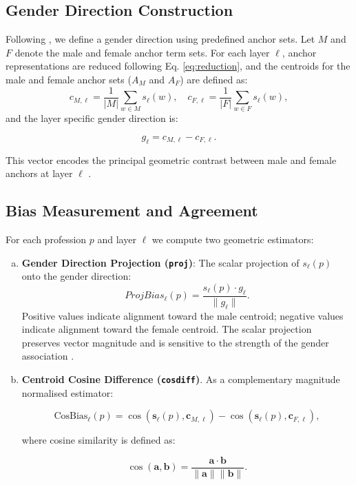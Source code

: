 \documentclass[english, a4paper, 11.5pt, twoside]{article}
\begin{document}
\subsection{Gender Direction Construction}
Following \cite{Bolukbasi:2016}, we define a gender direction using predefined anchor sets. Let $M$ and $F$ denote the male and female anchor term sets. For each layer $\ell$, anchor representations are reduced following Eq. \eqref{eq:reduction}, and the centroids for the male and female anchor sets ($A_M$ and $A_F$) are defined as: 
\begin{equation}
c_{M,\ell} = \frac{1}{|M|}\sum_{w \in M} s_\ell(w), \quad c_{F,\ell} = \frac{1}{|F|}\sum_{w \in F} s_\ell(w),
\end{equation}
and the layer specific gender direction is:

\begin{equation}
g_\ell = c_{M,\ell} - c_{F,\ell}.
\end{equation}

This vector encodes the principal geometric contrast between male and female anchors at layer $\ell$ \parencite{Bolukbasi:2016}.

\subsection{Bias Measurement and Agreement}
For each profession $p$ and layer $\ell$ we compute two geometric estimators:
\begin{enumerate}[(a)]
    \item \textbf{Gender Direction Projection (\texttt{proj})}: The scalar projection of $s_\ell(p)$ onto the gender direction:
    \begin{equation}
    ProjBias_\ell(p) = \frac{s_\ell(p) \cdot g_\ell}{\|g_\ell\|}.
    \end{equation}
    Positive values indicate alignment toward the male centroid; negative values indicate alignment toward the
female centroid. The scalar projection preserves vector magnitude and is sensitive to the strength of the
gender association \parencite{Bolukbasi:2016}.
    \item \noindent \textbf{Centroid Cosine Difference (\texttt{cosdiff})}. As a complementary magnitude normalised estimator:

\begin{equation}
    \text{CosBias}_\ell(p) = \cos(\mathbf{s}_\ell(p), \mathbf{c}_{M,\ell}) - \cos(\mathbf{s}_\ell(p), \mathbf{c}_{F,\ell}),
\end{equation}

where cosine similarity is defined as:

\begin{equation}
    \cos(\mathbf{a}, \mathbf{b}) = \frac{\mathbf{a} \cdot \mathbf{b}}{\|\mathbf{a}\| \|\mathbf{b}\|} .
\end{equation}
\end{enumerate}
\end{document}
